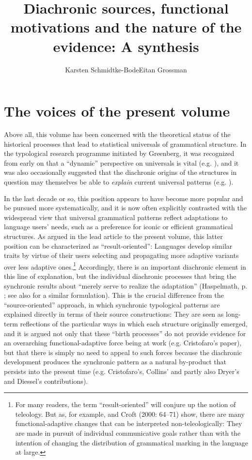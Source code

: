 \documentclass[output=paper]{langsci/langscibook}
\author{Karsten Schmidtke-Bode\affiliation{Leipzig University}\lastand Eitan Grossman\affiliation{Hebrew University of Jerusalem}}
\title{Diachronic sources, functional motivations and the nature of the evidence: A synthesis}
\begin{document}
\maketitle 
 
 

\section{The voices of the present volume}

Above all, this volume has been concerned with the theoretical status of the historical processes that lead to statistical universals of grammatical structure. In the typological research programme initiated by Greenberg, it was recognized from early on that a “dynamic” perspective on universals is vital (e.g. \citealt{Greenberg1969}), and it was also occasionally suggested that the diachronic origins of the structures in question may themselves be able to \textit{explain} current universal patterns (e.g. \citealt{Givón1975,Greenberg1978_Diachr}). 

In the last decade or so, this position appears to have become more popular and be pursued more systematically, and it is now often explicitly contrasted with the widespread view that universal grammatical patterns reflect adaptations to language users’ needs, such as a preference for iconic or efficient grammatical structures. As argued in the lead article to the present volume, this latter position can be characterized as “result-oriented”: Languages develop similar traits by virtue of their users selecting and propagating more adaptive variants over less adaptive ones.\footnote{For many readers, the term “result-oriented” will conjure up the notion of teleology. But as, for example, \citet{Keller1994} and Croft (2000: 64–71) show, there are many functional-adaptive changes that can be interpreted non-teleologically: They are made in pursuit of individual communicative goals rather than with the intention of changing the distribution of grammatical marking in the language at large.} Accordingly, there is an important diachronic element in this line of explanation, but the individual diachronic processes that bring the synchronic results about “merely serve to realize the adaptation” (Haspelmath, p. \pageref{p:haspelmath:merelyserve}; see also \citet[266]{Hawkins2004} for a similar formulation). This is the crucial difference from the “source-oriented” approach, in which synchronic typological patterns are explained directly in terms of their source constructions: They are seen as long-term reflections of the particular ways in which each structure originally emerged, and it is argued not only that these “birth processes” do not provide evidence for an overarching functional-adaptive force being at work (e.g. Cristofaro’s paper), but that there is simply no need to appeal to such forces because the diachronic development produces the synchronic pattern as a natural by-product that persists into the present time (e.g. Cristofaro’s, Collins’ and partly also Dryer’s and Diessel’s contributions). 
\end{document}

